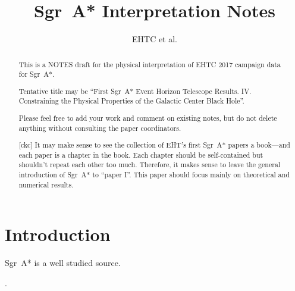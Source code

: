 \documentclass[twocolumn,tighten,dvipsnames]{aastex63}
\newcommand\sgra{Sgr~A*\xspace}
\newcommand\<{{\langle}}
\renewcommand\>{{\rangle}} %
\newcommand\ckc[1]{{\color{MidnightBlue}[ckc] #1}}
\begin{document}
\title{\sgra Interpretation Notes}
\author{EHTC et al.}

\shorttitle{\sgra Interpretation}

\revised{\today}

\begin{abstract}
  \color{BrickRed}

  This is a NOTES draft for the physical interpretation of EHTC 2017
  campaign data for \sgra.

  Tentative title may be ``First \sgra Event Horizon Telescope
  Results. IV. Constraining the Physical Properties of the Galactic
  Center Black Hole''.

  Please feel free to add your work and comment on existing notes, but
  do not delete anything without consulting the paper coordinators.

  \ckc{It may make sense to see the collection of EHT's first \sgra
    papers a book---and each paper is a chapter in the book.
    Each chapter should be self-contained but shouldn't repeat each
    other too much.
    Therefore, it makes sense to leave the general introduction of
    \sgra to ``paper I''.
    This paper should focus mainly on theoretical and numerical
    results.}
\end{abstract}


\section{Introduction} \label{sec:intro}


\sgra is a well studied source.

\citep{
  1998ApJ...492..554N,
  1999ApJ...522..870M,
  2000ApJ...541..234O,
  2003ANS...324..445M,
  2006MNRAS.370..219M,
  2007MNRAS.379.1519M,
  2009A&A...508L..13M,
  2009ApJ...698..676D,
  2009ApJ...701..521C,
  2009ApJ...706..497M,
  2012MNRAS.421.1315Z,
  2013A&A...559L...3M,
  2014A&A...570A...7M,
  2014ApJ...790....1B,
  2015A&A...576A..41B,
  2015ApJ...799....1C,
  2015ApJ...802...69B,
  2015ApJ...812..103C,
  2015ApJ...814..115P,
  2015Sci...350.1242J,
  2016A&A...588A..57F,
  2016ApJ...817..173L,
  2016ApJ...818..121P,
  2016ApJ...824...40O,
  2016ApJ...826...77B,
  2016ApJ...831....4P,
  2016MNRAS.455.2187M,
  2016PhRvL.116c1101J,
  2017ApJ...837..180G,
  2017ApJ...844...35M,
  2017ApJ...851..148M,
  2017MNRAS.467.3604R,
  2018A&A...612A..34D,
  2018ApJ...856..163M,
  2018ApJ...859...60L,
  2018ApJ...863..148P,
  2018ApJ...865..104J,
  2018ApJ...868..101B,
  2018JCAP...07..015H,
  2018MNRAS.478.1875J,
  2018MNRAS.478.5209C,
  2019ApJ...871...30I,
  2019ApJ...881L...2B,
  2019ApJ...884..148B,
  2019ApJ...886...96H,
  2019GReGr..51..137P,
  2020ApJ...896L...6R,
  2020ApJ...897...99T,
  2020MNRAS.492.3272R,
  2020MNRAS.493.1404A,
  2020MNRAS.494.4168D,
  2020MNRAS.494.5923P,
  2020arXiv200514251B,
  2020arXiv200603657D,
  2020arXiv200603658P
}.
\end{document}
